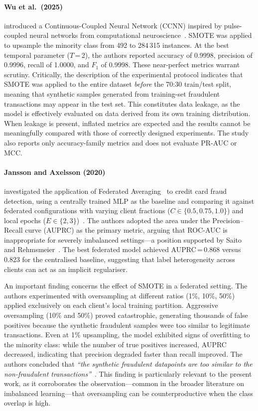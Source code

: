 \paragraph{Wu et al.\ (2025)}
introduced a Continuous-Coupled Neural Network (CCNN) inspired by pulse-coupled neural networks from computational neuroscience~\cite{wu2025ccnn}. SMOTE was applied to upsample the minority class from 492 to 284\,315 instances. At the best temporal parameter ($T$\,=\,2), the authors reported accuracy of 0.9998, precision of 0.9996, recall of 1.0000, and $F_1$ of 0.9998. These near-perfect metrics warrant scrutiny. Critically, the description of the experimental protocol indicates that SMOTE was applied to the entire dataset \emph{before} the 70:30 train/test split, meaning that synthetic samples generated from training-set fraudulent transactions may appear in the test set. This constitutes data leakage, as the model is effectively evaluated on data derived from its own training distribution. When leakage is present, inflated metrics are expected and the results cannot be meaningfully compared with those of correctly designed experiments. The study also reports only accuracy-family metrics and does not evaluate PR-AUC or MCC.

\paragraph{Jansson and Axelsson (2020)}
investigated the application of Federated Averaging~\cite{mcmahan2017communication} to credit card fraud detection, using a centrally trained MLP as the baseline and comparing it against federated configurations with varying client fractions ($C \in \{0.5, 0.75, 1.0\}$) and local epochs ($E \in \{2, 3\}$)~\cite{jansson2020federated}. The authors adopted the area under the Precision--Recall curve (AUPRC) as the primary metric, arguing that ROC-AUC is inappropriate for severely imbalanced settings---a position supported by Saito and Rehmsmeier~\cite{saito2015precision}. The best federated model achieved AUPRC\,=\,0.868 versus 0.823 for the centralised baseline, suggesting that label heterogeneity across clients can act as an implicit regulariser.

An important finding concerns the effect of SMOTE in a federated setting. The authors experimented with oversampling at different ratios (1\%, 10\%, 50\%) applied exclusively on each client's local training partition. Aggressive oversampling (10\% and 50\%) proved catastrophic, generating thousands of false positives because the synthetic fraudulent samples were too similar to legitimate transactions. Even at 1\% upsampling, the model exhibited signs of overfitting to the minority class: while the number of true positives increased, AUPRC decreased, indicating that precision degraded faster than recall improved. The authors concluded that \emph{``the synthetic fraudulent datapoints are too similar to the non-fraudulent transactions''}~\cite{jansson2020federated}. This finding is particularly relevant to the present work, as it corroborates the observation---common in the broader literature on imbalanced learning---that oversampling can be counterproductive when the class overlap is high.

